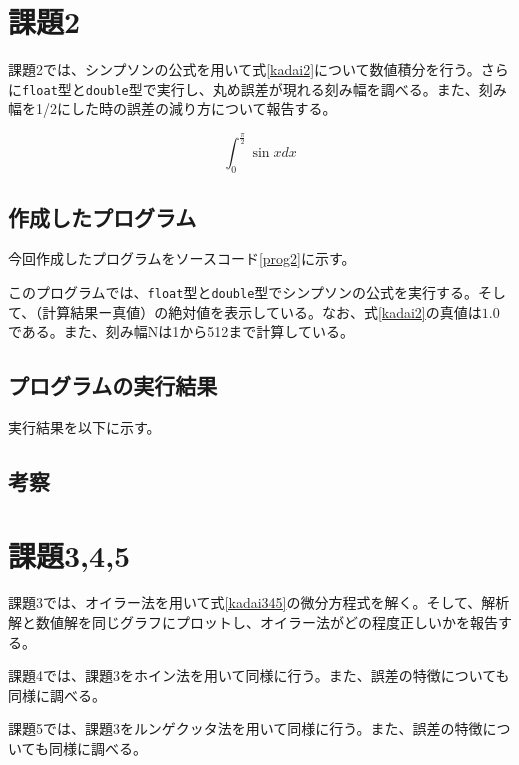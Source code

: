 \documentclass[10pt,titlepage]{jsarticle}
\begin{document}
\section{課題2}
課題2では、シンプソンの公式を用いて式\ref{kadai2}について数値積分を行う。さらに{\tt float}型と{\tt double}型で実行し、丸め誤差が現れる刻み幅を調べる。また、刻み幅を1/2にした時の誤差の減り方について報告する。

\begin{equation}
\label{kadai2}
	\int_0^\frac{\pi}{2} \sin x dx
\end{equation}

\subsection{作成したプログラム}
今回作成したプログラムをソースコード\ref{prog2}に示す。



このプログラムでは、{\tt float}型と{\tt double}型でシンプソンの公式を実行する。そして、（計算結果ー真値）の絶対値を表示している。なお、式\ref{kadai2}の真値は$1.0$である。また、刻み幅Nは1から512まで計算している。

\subsection{プログラムの実行結果}
実行結果を以下に示す。
\begin{oframed}
\end{oframed}


\subsection{考察}

\section{課題3,4,5}
課題3では、オイラー法を用いて式\ref{kadai345}の微分方程式を解く。そして、解析解と数値解を同じグラフにプロットし、オイラー法がどの程度正しいかを報告する。

課題4では、課題3をホイン法を用いて同様に行う。また、誤差の特徴についても同様に調べる。

課題5では、課題3をルンゲクッタ法を用いて同様に行う。また、誤差の特徴についても同様に調べる。
\end{document}
